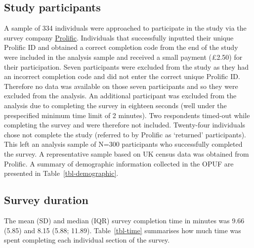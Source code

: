 \documentclass[
  number,
  preprint]{elsarticle}
\begin{document}
\subsection{Study participants}\label{study-participants}

A sample of 334 individuals were approached to participate in the study
via the survey company \href{https://www.prolific.com}{Prolific}.
Individuals that successfully inputted their unique Prolific ID and
obtained a correct completion code from the end of the study were
included in the analysis sample and received a small payment (£2.50) for
their participation. Seven participants were excluded from the study as
they had an incorrect completion code and did not enter the correct
unique Prolific ID. Therefore no data was available on those seven
participants and so they were excluded from the analysis. An additional
participant was excluded from the analysis due to completing the survey
in eighteen seconds (well under the prespecified minimum time limit of 2
minutes). Two respondents timed-out while completing the survey and were
therefore not included. Twenty-four individuals chose not complete the
study (referred to by Prolific as `returned' participants). This left an
analysis sample of N=300 participants who successfully completed the
survey. A representative sample based on UK census data was obtained
from Prolific. A summary of demographic information collected in the
OPUF are presented in Table~\ref{tbl-demographic}.

\subsection{Survey duration}\label{survey-duration}

The mean (SD) and median (IQR) survey completion time in minutes was
9.66 (5.85) and 8.15 (5.88; 11.89). Table~\ref{tbl-time} summarises how
much time was spent completing each individual section of the survey.
\end{document}
